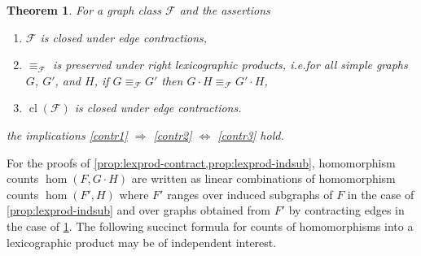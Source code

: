 \documentclass[3p,final]{elsarticle}
\DeclareMathOperator{\cl}{cl}
\newtheorem{theorem}{Theorem}
\begin{document}
	\begin{theorem} \label{prop:lexprod-contract}
		For a graph class $\mathcal{F}$ and the assertions
		\begin{enumerate}
			\item $\mathcal{F}$ is closed under edge contractions,\label{contr1}
			\item $\equiv_{\mathcal{F}}$ is \emph{preserved under right lexicographic products}, i.e.\@  for all simple graphs $G$, $G'$, and $H$, if $G \equiv_{\mathcal{F}} G'$ then $G \cdot H \equiv_{\mathcal{F}} G' \cdot H$,\label{contr2}
			\item $\cl(\mathcal{F})$ is closed under edge contractions.\label{contr3}
		\end{enumerate}
		the implications \ref{contr1} $\Rightarrow$ \ref{contr2} $\Leftrightarrow$ \ref{contr3} hold.
	\end{theorem}


	For the proofs of \cref{prop:lexprod-contract,prop:lexprod-indsub}, homomorphism counts $\hom(F, G \cdot H)$ are written as linear combinations of homomorphism counts $\hom(F', H)$ where $F'$ ranges over induced subgraphs of $F$ in the case of \cref{prop:lexprod-indsub} and over graphs obtained from $F'$ by contracting edges in the case of \cref{prop:lexprod-contract}.
	The following succinct formula for counts of homomorphisms into a lexicographic product may  be of independent interest.
	
\end{document}
